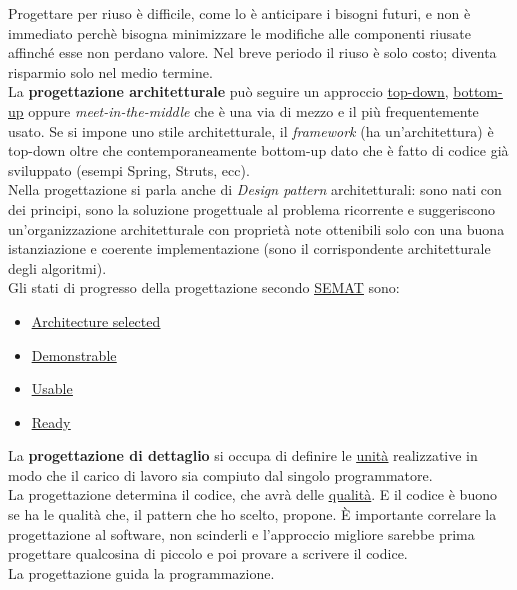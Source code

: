 		Progettare per riuso è difficile, come lo è anticipare i bisogni futuri, e non è immediato perchè bisogna minimizzare le modifiche alle componenti riusate affinché esse non perdano valore. Nel breve periodo il riuso è solo costo; diventa risparmio solo nel medio termine.\\
		La \textbf{progettazione architetturale} può seguire un approccio \underline{\hyperref[topdown]{top-down}}, \underline{\hyperref[bottomup]{bottom-up}} oppure \textit{meet-in-the-middle} che è una via di mezzo e il più frequentemente usato. Se si impone uno stile architetturale, il \textit{framework} (ha un'architettura) è top-down oltre che contemporaneamente bottom-up dato che è fatto di codice già sviluppato (esempi Spring, Struts, ecc).\\
		Nella progettazione si parla anche di \textit{Design pattern} architetturali: sono nati con dei principi, sono la soluzione progettuale al problema ricorrente e suggeriscono un'organizzazione architetturale con proprietà note ottenibili solo con una buona istanziazione e coerente implementazione (sono il corrispondente architetturale degli algoritmi). \\

		Gli stati di progresso della progettazione secondo \underline{\hyperref[semat]{SEMAT}} sono:
			\begin{itemize}
				\item \underline{\hyperref[architectureselected]{Architecture selected}}
				\item \underline{\hyperref[demonstrable]{Demonstrable}}
				\item \underline{\hyperref[usable]{Usable}}
				\item \underline{\hyperref[ready]{Ready}}
			\end{itemize}

		La \textbf{progettazione di dettaglio} si occupa di definire le \underline{\hyperref[unita]{unità}} realizzative in modo che il carico di lavoro sia compiuto dal singolo programmatore.\\
		La progettazione determina il codice, che avrà delle \underline{\hyperref[qualita]{qualità}}.
		E il codice è buono se ha le qualità che, il pattern che ho scelto, propone.
		È importante correlare la progettazione al software, non scinderli e l'approccio migliore sarebbe prima progettare qualcosina di piccolo e poi provare a scrivere il codice.\\
		La progettazione guida la programmazione.


